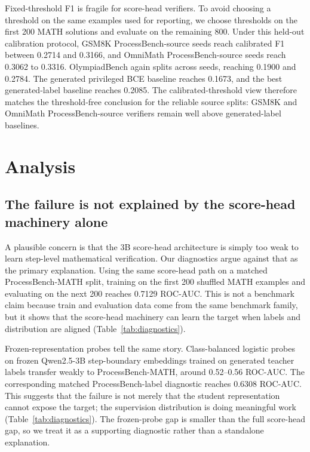 \documentclass{article}
\begin{document}
Fixed-threshold F1 is fragile for score-head verifiers.
To avoid choosing a threshold on the same examples used for reporting, we choose thresholds on the first 200 MATH solutions and evaluate on the remaining 800.
Under this held-out calibration protocol, GSM8K ProcessBench-source seeds reach calibrated F1 between 0.2714 and 0.3166, and OmniMath ProcessBench-source seeds reach 0.3062 to 0.3316.
OlympiadBench again splits across seeds, reaching 0.1900 and 0.2784.
The generated privileged BCE baseline reaches 0.1673, and the best generated-label baseline reaches 0.2085.
The calibrated-threshold view therefore matches the threshold-free conclusion for the reliable source splits: GSM8K and OmniMath ProcessBench-source verifiers remain well above generated-label baselines.

\section{Analysis}

\subsection{The failure is not explained by the score-head machinery alone}

A plausible concern is that the 3B score-head architecture is simply too weak to learn step-level mathematical verification.
Our diagnostics argue against that as the primary explanation.
Using the same score-head path on a matched ProcessBench-MATH split, training on the first 200 shuffled MATH examples and evaluating on the next 200 reaches 0.7129 ROC-AUC.
This is not a benchmark claim because train and evaluation data come from the same benchmark family, but it shows that the score-head machinery can learn the target when labels and distribution are aligned (Table~\ref{tab:diagnostics}).

Frozen-representation probes tell the same story.
Class-balanced logistic probes on frozen Qwen2.5-3B step-boundary embeddings trained on generated teacher labels transfer weakly to ProcessBench-MATH, around 0.52--0.56 ROC-AUC.
The corresponding matched ProcessBench-label diagnostic reaches 0.6308 ROC-AUC.
This suggests that the failure is not merely that the student representation cannot expose the target; the supervision distribution is doing meaningful work (Table~\ref{tab:diagnostics}).
The frozen-probe gap is smaller than the full score-head gap, so we treat it as a supporting diagnostic rather than a standalone explanation.
\end{document}
